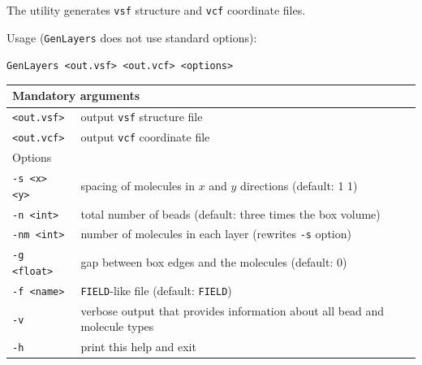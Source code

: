 The utility generates \texttt{vsf} structure and \texttt{vcf} coordinate
files.

Usage (\texttt{GenLayers} does not use standard options):

\vspace{1em}
\noindent
\texttt{GenLayers <out.vsf> <out.vcf> <options>}

\noindent
\begin{longtable}{p{}p{}}
  \toprule
  \multicolumn{2}{l}{Mandatory arguments} \\
  \midrule
  \texttt{<out.vsf>} & output \texttt{vsf} structure file \\
  \texttt{<out.vcf>} & output \texttt{vcf} coordinate file \\
  \toprule
  \multicolumn{2}{l}{Options} \\
  \midrule
  \texttt{-s <x> <y>} & spacing of molecules in $x$ and $y$ directions
    (default: 1 1) \\
  \texttt{-n <int>} & total number of beads (default: three times the box
    volume)\\
  \texttt{-nm <int>} & number of molecules in each layer (rewrites
    \texttt{-s} option) \\
  \texttt{-g <float>} & gap between box edges and the molecules (default: 0)\\
  \texttt{-f <name>} & \texttt{FIELD}-like file (default: \texttt{FIELD}) \\
  \texttt{-v}        & verbose output that provides information about all
    bead and molecule types \\
  \texttt{-h}        & print this help and exit \\
  \bottomrule
\end{longtable}
